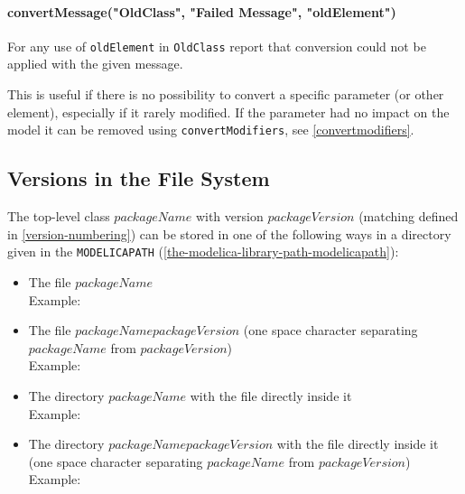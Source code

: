 \paragraph*{convertMessage("OldClass", "Failed Message", "oldElement")}\label{convertmessageoldclass-failed-message2}

For any use of \lstinline!oldElement! in \lstinline!OldClass! report that conversion could not be applied with the given message.

\begin{nonnormative}
This is useful if there is no possibility to convert a specific parameter (or other element), especially if it rarely modified.
If the parameter had no impact on the model it can be removed using \lstinline!convertModifiers!, see \cref{convertmodifiers}.
\end{nonnormative}


\subsection{Versions in the File System}\label{mapping-of-versions-to-file-system}\label{versions-in-the-File-System}

The top-level class $\mathit{packageName}$ with version $\mathit{packageVersion}$ (matching  defined in \cref{version-numbering}) can be stored in one of the following ways in a directory given in the \lstinline!MODELICAPATH! (\cref{the-modelica-library-path-modelicapath}):
\begin{itemize}
\item
  The file $\mathit{packageName}$\\
  Example: 
\item
  The file $\mathit{packageName}$\filename{\ }$\mathit{packageVersion}$ (one space character separating $\mathit{packageName}$ from $\mathit{packageVersion}$)\\
  Example: 
\item
  The directory $\mathit{packageName}$ with the file  directly inside it\\
  Example: 
\item
  The directory $\mathit{packageName}$\filename{\ }$\mathit{packageVersion}$ with the file  directly inside it (one space character separating $\mathit{packageName}$ from $\mathit{packageVersion}$)\\
  Example: 
\end{itemize}

